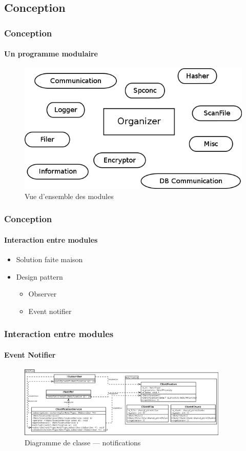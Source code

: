 \documentclass{beamer}
\begin{document}
\subsection{Conception}
\begin{frame}
 \frametitle{Conception}
 \framesubtitle{Un programme modulaire}
  \begin{figure}[h!]
    \centering
    \includegraphics[scale=0.42]{softwareDesign/overviewModule.png}
    \caption{Vue d'ensemble des modules}
  \end{figure}
\end{frame}

\begin{frame}
 \frametitle{Conception}
 \framesubtitle{Interaction entre modules}
 \begin{itemize}
  \item Solution faite \flqq maison\frqq
  \item Design pattern
  \begin{itemize}
   \item Observer
   \item Event notifier
  \end{itemize}
 \end{itemize}
\end{frame}

\begin{frame}
 \frametitle{Interaction entre modules}
 \framesubtitle{Event Notifier}
  \begin{figure}
    \centering
    \includegraphics[width=10cm]{softwareDesign/classDiagramNotif.png}
    \caption{Diagramme de classe --- notifications}
  \end{figure}
\end{frame}
\end{document}
